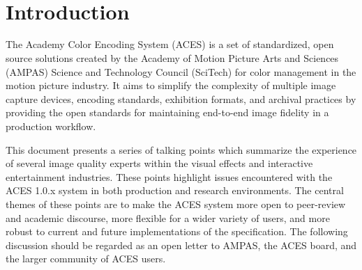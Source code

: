 \documentclass[conference]{IEEEtran}
\begin{document}
{\IEEEauthorblockN{}\\
\\
\IEEEauthorblockN{}\\
\\
\\
\\
\IEEEauthorblockN{}\\
\\
\\
}

\maketitle

\IEEEpeerreviewmaketitle

\section{Introduction}
The Academy Color Encoding System (ACES) is a set of standardized, open source solutions created by the Academy of Motion Picture Arts and Sciences (AMPAS) Science and Technology Council (SciTech) for color management in the motion picture industry. It aims to simplify the complexity of multiple image capture devices, encoding standards, exhibition formats, and archival practices by providing the open standards for maintaining end-to-end image fidelity in a production workflow.

This document presents a series of talking points which summarize the experience of several image quality experts within the visual effects and interactive entertainment industries. These points highlight issues encountered with the ACES 1.0.x system in both production and research environments. The central themes of these points are to make the ACES system more open to peer-review and academic discourse, more flexible for a wider variety of users, and more robust to current and future implementations of the specification. The following discussion should be regarded as an open letter to AMPAS, the ACES board, and the larger community of ACES users.
\end{document}
